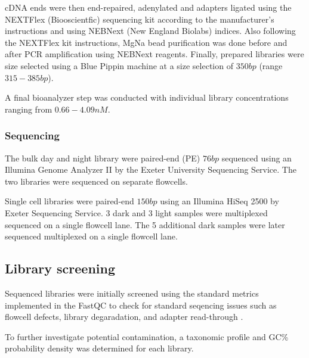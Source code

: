 cDNA ends were then end-repaired, adenylated and adapters ligated using the NEXTFlex (Biooscientfic) sequencing kit 
according to the manufacturer's instructions and using NEBNext (New England Biolabs) indices.  Also following
the NEXTFlex kit instructions, MgNa bead purification was done before and after PCR amplification using
NEBNext reagents.  Finally, prepared libraries were size selected using a Blue Pippin machine at a size selection
of \(350bp\) (range \(315-385bp\)).

A final bioanalyzer step was conducted with individual library concentrations ranging from \(0.66-4.09nM\).


\subsubsection{Sequencing}

The bulk day and night library were paired-end (PE) \(76bp\) sequenced using an Illumina Genome
Analyzer II by the Exeter University Sequencing Service.  The two libraries were sequenced
on separate flowcells.

Single cell libraries were paired-end \(150bp\) using an Illumina HiSeq 2500 by Exeter
Sequencing Service. 3 dark and 3 light samples were multiplexed sequenced on a single 
flowcell lane.  The 5 additional dark samples were later sequenced multiplexed on a single
flowcell lane.

\subsection{Library screening}

Sequenced libraries were initially screened using the standard
metrics implemented in the FastQC to check for standard seqencing issues
such as flowcell defects, library degaradation, and adapter read-through \citep{fastqc}.

To further investigate potential contamination, a taxonomic
profile and GC\% probability density was determined for each library.

